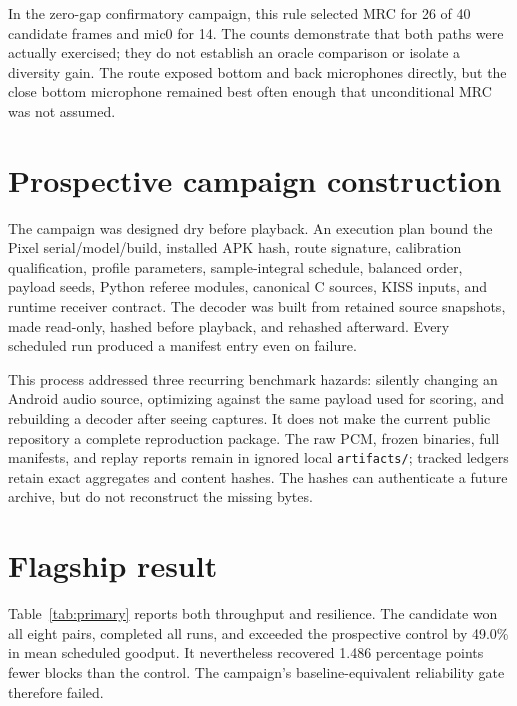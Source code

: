 \documentclass[11pt]{article}
\begin{document}
In the zero-gap confirmatory campaign, this rule selected MRC for 26 of 40
candidate frames and mic0 for 14. The counts demonstrate that both paths were
actually exercised; they do not establish an oracle comparison or isolate a
diversity gain. The route exposed bottom and back microphones directly, but
the close bottom microphone remained best often enough that unconditional MRC
was not assumed.

\section{Prospective campaign construction}
\label{sec:campaign}

The campaign was designed dry before playback. An execution plan bound the
Pixel serial/model/build, installed APK hash, route signature, calibration
qualification, profile parameters, sample-integral schedule, balanced order,
payload seeds, Python referee modules, canonical C sources, KISS inputs, and
runtime receiver contract. The decoder was built from retained source
snapshots, made read-only, hashed before playback, and rehashed afterward.
Every scheduled run produced a manifest entry even on failure.

This process addressed three recurring benchmark hazards: silently changing
an Android audio source, optimizing against the same payload used for scoring,
and rebuilding a decoder after seeing captures. It does not make the current
public repository a complete reproduction package. The raw PCM, frozen
binaries, full manifests, and replay reports remain in ignored local
\texttt{artifacts/}; tracked ledgers retain exact aggregates and content
hashes. The hashes can authenticate a future archive, but do not reconstruct
the missing bytes.

\section{Flagship result}
\label{sec:flagship}

Table~\ref{tab:primary} reports both throughput and resilience. The candidate
won all eight pairs, completed all runs, and exceeded the prospective control
by 49.0\% in mean scheduled goodput. It nevertheless recovered 1.486 percentage
points fewer blocks than the control. The campaign's baseline-equivalent
reliability gate therefore failed.
\end{document}
